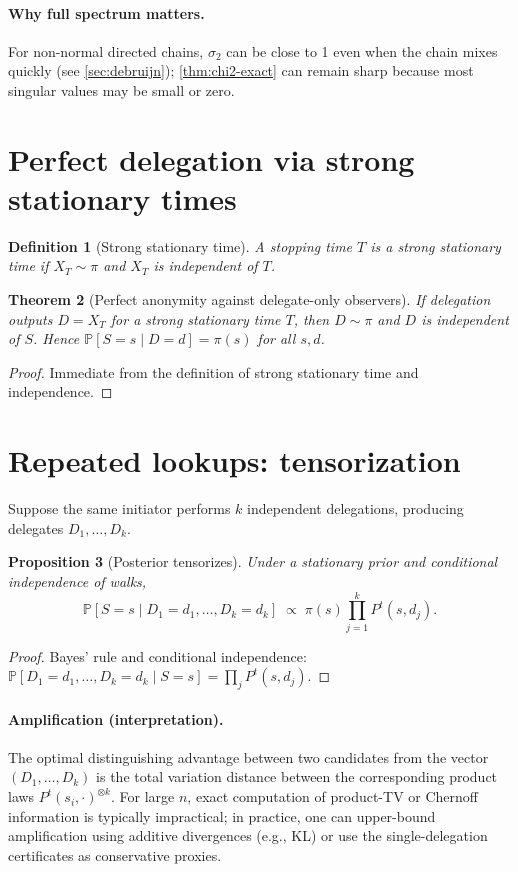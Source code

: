 \documentclass[11pt]{article}
\newtheorem{theorem}{Theorem}[section]
\newtheorem{definition}[theorem]{Definition}
\newtheorem{proposition}[theorem]{Proposition}
\newcommand{\Prb}{\mathbb{P}}
\begin{document}
\paragraph{Why full spectrum matters.}
For non-normal directed chains, $\sigma_2$ can be close to 1 even when the chain
mixes quickly (see \cref{sec:debruijn}); \cref{thm:chi2-exact} can remain sharp
because most singular values may be small or zero.

\section{Perfect delegation via strong stationary times}\label{sec:sst}
\begin{definition}[Strong stationary time]
A stopping time $T$ is a \emph{strong stationary time} if $X_T\sim\pi$ and
$X_T$ is independent of $T$.
\end{definition}

\begin{theorem}[Perfect anonymity against delegate-only observers]
If delegation outputs $D=X_T$ for a strong stationary time $T$, then $D\sim\pi$
and $D$ is independent of $S$. Hence $\Prb[S=s\mid D=d]=\pi(s)$ for all $s,d$.
\end{theorem}
\begin{proof}
Immediate from the definition of strong stationary time and independence.
\end{proof}

\section{Repeated lookups: tensorization}\label{sec:repeated}
Suppose the same initiator performs $k$ independent delegations, producing
delegates $D_1,\dots,D_k$.

\begin{proposition}[Posterior tensorizes]\label{prop:tensor}
Under a stationary prior and conditional independence of walks,
\[
\Prb[S=s\mid D_1=d_1,\dots,D_k=d_k]
\;\propto\; \pi(s)\prod_{j=1}^k P^t(s,d_j).
\]
\end{proposition}
\begin{proof}
Bayes' rule and conditional independence:
$\Prb[D_1=d_1,\dots,D_k=d_k\mid S=s]=\prod_j P^t(s,d_j)$.
\end{proof}

\paragraph{Amplification (interpretation).}
The optimal distinguishing advantage between two candidates from the vector
$(D_1,\dots,D_k)$ is the total variation distance between the corresponding
product laws $P^t(s_i,\cdot)^{\otimes k}$. For large $n$, exact computation of
product-TV or Chernoff information is typically impractical; in practice, one
can upper-bound amplification using additive divergences (e.g., KL) or use the
single-delegation certificates as conservative proxies.
\end{document}
